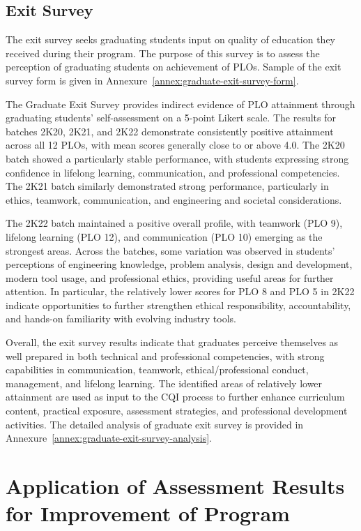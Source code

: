 \subsection{Exit Survey}

The exit survey seeks graduating students input on quality of education they received during their program. The purpose of this survey is to assess the perception of graduating students on achievement of PLOs. Sample of the exit survey form is given in Annexure~\ref{annex:graduate-exit-survey-form}.

The Graduate Exit Survey provides indirect evidence of PLO attainment through graduating students’ self-assessment on a 5-point Likert scale. The results for batches 2K20, 2K21, and 2K22 demonstrate consistently positive attainment across all 12 PLOs, with mean scores generally close to or above 4.0. The 2K20 batch showed a particularly stable performance, with students expressing strong confidence in lifelong learning, communication, and professional competencies. The 2K21 batch similarly demonstrated strong performance, particularly in ethics, teamwork, communication, and engineering and societal considerations.

The 2K22 batch maintained a positive overall profile, with teamwork (PLO 9), lifelong learning (PLO 12), and communication (PLO 10) emerging as the strongest areas. Across the batches, some variation was observed in students’ perceptions of engineering knowledge, problem analysis, design and development, modern tool usage, and professional ethics, providing useful areas for further attention. In particular, the relatively lower scores for PLO 8 and PLO 5 in 2K22 indicate opportunities to further strengthen ethical responsibility, accountability, and hands-on familiarity with evolving industry tools.

Overall, the exit survey results indicate that graduates perceive themselves as well prepared in both technical and professional competencies, with strong capabilities in communication, teamwork, ethical/professional conduct, management, and lifelong learning. The identified areas of relatively lower attainment are used as input to the CQI process to further enhance curriculum content, practical exposure, assessment strategies, and professional development activities. The detailed analysis of graduate exit survey is provided in Annexure~\ref{annex:graduate-exit-survey-analysis}. 

\hypertarget{sec:application}{%
\section{Application of Assessment Results for Improvement of Program}\label{sec:application}}

